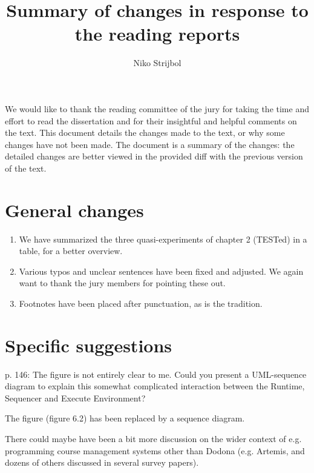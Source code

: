 \documentclass[
    paper=a4,
    paper=portrait,
    parskip=half,
]{scrartcl}
\author{Niko Strijbol}
\title{Summary of changes in response to the reading reports}
\newenvironment{point}{%
    \itshape%
  }{%
    \nopagebreak%
}
\newenvironment{reply}{}{%
    \vspace{0.8cm}
}
\begin{document}
\maketitle

We would like to thank the reading committee of the jury for taking the time and effort to read the dissertation and for their insightful and helpful comments on the text.
This document details the changes made to the text, or why some changes have not been made.
The document is a summary of the changes: the detailed changes are better viewed in the provided diff with the previous version of the text.

\section{General changes}\label{sec:general-changes}

\begin{enumerate}
    \item We have summarized the three quasi-experiments of chapter 2 (TESTed) in a table, for a better overview.
    \item Various typos and unclear sentences have been fixed and adjusted.
        We again want to thank the jury members for pointing these out.
    \item Footnotes have been placed after punctuation, as is the tradition.
\end{enumerate}

\section{Specific suggestions}\label{sec:specific-suggestions}

\begin{point}
    p. 146: The figure is not entirely clear to me. Could you present a UML-sequence diagram to explain this somewhat complicated interaction between the Runtime, Sequencer and Execute Environment?
\end{point}

\begin{reply}
\noindent The figure (figure 6.2) has been replaced by a sequence diagram.
\end{reply}

\begin{point}
    There could maybe have been a bit more discussion on the wider context of e.g. programming course management systems other than Dodona (e.g. Artemis, and dozens of others discussed in several survey papers).
\end{point}
\end{document}
